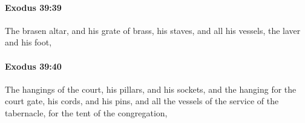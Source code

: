 		\paragraph{Exodus 39:39} %
			\label{EXODUS-39-39}

			The brasen altar, and his grate of brass, his staves, and all his vessels, the laver and his foot,


		\paragraph{Exodus 39:40} %
			\label{EXODUS-39-40}

			The hangings of the court, his pillars, and his sockets, and the hanging for the court gate, his cords, and his pins, and all the vessels of the service of the tabernacle, for the tent of the congregation,


